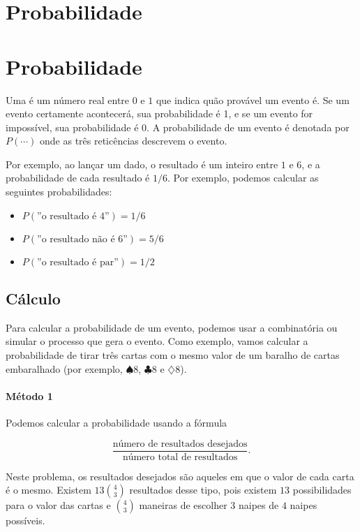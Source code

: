 \chapter{Probabilidade}

\chapter{Probabilidade}

Uma  é um número real entre $0$ e $1$
que indica quão provável um evento é.
Se um evento certamente acontecerá,
sua probabilidade é 1,
e se um evento for impossível,
sua probabilidade é 0.
A probabilidade de um evento é denotada por $P(\cdots)$
onde as três reticências descrevem o evento.

Por exemplo, ao lançar um dado,
o resultado é um inteiro entre $1$ e $6$,
e a probabilidade de cada resultado é $1/6$.
Por exemplo, podemos calcular as seguintes probabilidades:

\begin{itemize}[noitemsep]
\item $P(\textrm{''o resultado é 4''})=1/6$
\item $P(\textrm{''o resultado não é 6''})=5/6$
\item $P(\textrm{''o resultado é par''})=1/2$
\end{itemize}

\section{Cálculo}

Para calcular a probabilidade de um evento,
podemos usar a combinatória
ou simular o processo que gera o evento.
Como exemplo, vamos calcular a probabilidade
de tirar três cartas com o mesmo valor
de um baralho de cartas embaralhado
(por exemplo, $\spadesuit 8$, $\clubsuit 8$ e $\diamondsuit 8$).

\subsubsection*{Método 1}

Podemos calcular a probabilidade usando a fórmula

\[\frac{\textrm{número de resultados desejados}}{\textrm{número total de resultados}}.\]

Neste problema, os resultados desejados são aqueles
em que o valor de cada carta é o mesmo.
Existem $13 {4 \choose 3}$ resultados desse tipo,
pois existem $13$ possibilidades para o
valor das cartas e ${4 \choose 3}$ maneiras de
escolher $3$ naipes de $4$ naipes possíveis.

